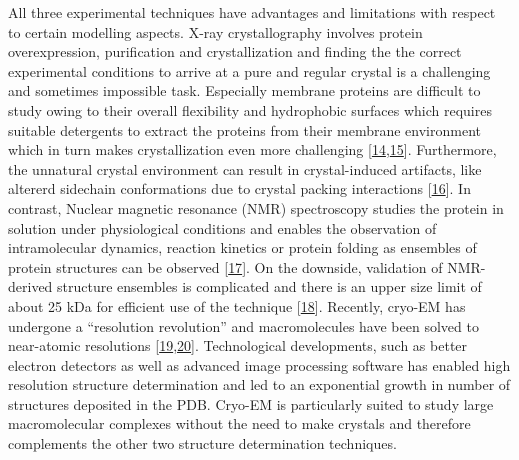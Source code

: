 \documentclass[11pt,a4paper,twoside]{book}
\theoremstyle{definition}
\theoremstyle{definition}
\theoremstyle{remark}
\begin{document}
All three experimental techniques have advantages and limitations with
respect to certain modelling aspects. X-ray crystallography involves
protein overexpression, purification and crystallization and finding the
the correct experimental conditions to arrive at a pure and regular
crystal is a challenging and sometimes impossible task. Especially
membrane proteins are difficult to study owing to their overall
flexibility and hydrophobic surfaces which requires suitable detergents
to extract the proteins from their membrane environment which in turn
makes crystallization even more challenging
{[}\protect\hyperlink{ref-Carpenter2008}{14},\protect\hyperlink{ref-Moraes2014}{15}{]}.
Furthermore, the unnatural crystal environment can result in
crystal-induced artifacts, like altererd sidechain conformations due to
crystal packing interactions
{[}\protect\hyperlink{ref-Jacobson2002}{16}{]}. In contrast, Nuclear
magnetic resonance (NMR) spectroscopy studies the protein in solution
under physiological conditions and enables the observation of
intramolecular dynamics, reaction kinetics or protein folding as
ensembles of protein structures can be observed
{[}\protect\hyperlink{ref-Bieri2011}{17}{]}. On the downside, validation
of NMR-derived structure ensembles is complicated and there is an upper
size limit of about 25 kDa for efficient use of the technique
{[}\protect\hyperlink{ref-Billeter2008}{18}{]}. Recently, cryo-EM has
undergone a ``resolution revolution'' and macromolecules have been
solved to near-atomic resolutions
{[}\protect\hyperlink{ref-Egelman2016}{19},\protect\hyperlink{ref-Fernandez-Leiro2016}{20}{]}.
Technological developments, such as better electron detectors as well as
advanced image processing software has enabled high resolution structure
determination and led to an exponential growth in number of structures
deposited in the PDB. Cryo-EM is particularly suited to study large
macromolecular complexes without the need to make crystals and therefore
complements the other two structure determination techniques.
\end{document}
